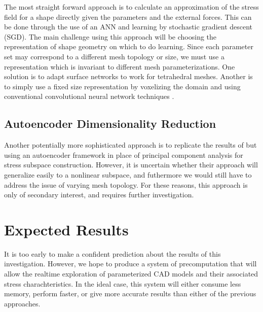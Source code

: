 \documentclass[acmtog, authorversion]{acmart}
\begin{document}
The most straight forward approach is to calculate an approximation of the stress field for a shape directly given the parameters and the external forces. This can be done through the use of an ANN and learning by stochastic gradient descent (SGD). The main challenge using this approach will be choosing the representation of shape geometry on which to do learning. Since each parameter set may correspond to a different mesh topology or size, we must use a representation which is invariant to different mesh parameterizations. One solution is to adapt surface networks \cite{Krostikov-17} to work for tetrahedral meshes. Another is to simply use a fixed size representation by voxelizing the domain and using conventional convolutional neural network techniques \cite{Wang-17}.

\subsection{Autoencoder Dimensionality Reduction}
Another potentially more sophisticated approach is to replicate the results of \cite{Schulz-17} but using an autoencoder framework in place of principal component analysis for stress subspace construction. However, it is uncertain whether their approach will generalize easily to a nonlinear subspace, and futhermore we would still have to address the issue of varying mesh topology. For these reasons, this approach is only of secondary interest, and requires further investigation.

\section{Expected Results}

It is too early to make a confident prediction about the results of this investigation. However, we hope to produce a system of precomputation that will allow the realtime exploration of parameterized CAD models and their associated stress charachteristics. In the ideal case, this system will either consume less memory, perform faster, or give more accurate results than either of the previous approaches.



\end{document}

